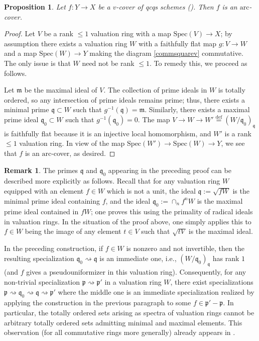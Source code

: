\documentclass[reqno]{amsart}
\newcommand{\arc}{\mathrm{arc}}
\newtheorem{proposition}[theorem]{Proposition}
\theoremstyle{definition}
\newtheorem{remark}[theorem]{Remark}
\begin{document}
\begin{proposition} 
\label{visv1}
Let $f\colon  Y \to X$ be a $v$-cover of qcqs schemes ().   Then $f$ is an $\arc$-cover. 
\end{proposition} 
\begin{proof} 
Let $V$ be a rank $\leq 1$ valuation ring 
with a map $\mathrm{Spec} (V) \to X$; by assumption there exists a 
valuation ring $W$ with 
a faithfully flat map $g\colon  V \to W$ and a map $\mathrm{Spec} (W) \to Y$ making the diagram
\eqref{commsquarev} commutative. 
The only issue is that $W$ need not be rank $\leq 1$.  To remedy this, we  proceed  as follows. 

Let $\mathfrak{m}$ be the maximal ideal of $V$. The collection of prime ideals in $W$ is totally ordered, so any
intersection of prime ideals remains prime; thus, there exists a minimal prime
$\mathfrak{q} \subset W$ such that $g^{-1}(\mathfrak{q}) = \mathfrak{m}$. 
Similarly, there exists a maximal prime ideal $\mathfrak{q}_0 \subset W$ such
that $g^{-1}( \mathfrak{q}_0) = 0$.  The map $V \to W \to W'
\stackrel{\mathrm{def}}{=} 
(W/\mathfrak{q}_0)_{\mathfrak{q}}$ is faithfully flat because it is an injective
local homomorphism, and $W'$ is a 
rank $\leq 1$ valuation ring. 
In view of the map $\mathrm{Spec} (W') \to \mathrm{Spec} (W) \to Y$, we
see that $f$ is an $\arc$-cover, as desired. 
\end{proof} 

\begin{remark}
The primes $\mathfrak{q}$ and $\mathfrak{q}_0$ appearing in the preceding proof
can be described more explicitly as follows. Recall that for any valuation ring
$W$ equipped with an element $f \in W$ which is not a unit, the ideal $\mathfrak{q} := \sqrt{fW}$ is the minimal prime ideal containing $f$, and the ideal $\mathfrak{q}_0 := \cap_n f^n W$ is the maximal prime ideal contained in $fW$; one proves this using the primality of radical ideals in valuation rings. In the situation of the proof above, one simply applies this to $f \in W$ being the image of any element $t \in V$ such that $\sqrt{tV}$ is the maximal ideal.

In the preceding construction, if $f \in W$ is nonzero and not invertible, then the resulting specialization $\mathfrak{q}_0 \rightsquigarrow \mathfrak{q}$ is an immediate one, i.e., $(W/\mathfrak{q}_0)_{\mathfrak{q}}$ has rank $1$ (and $f$ gives a pseudouniformizer in this valuation ring). Consequently, for any non-trivial specialization $\mathfrak{p} \rightsquigarrow \mathfrak{p}'$ in a valuation ring $W$, there exist specializations $\mathfrak{p} \rightsquigarrow \mathfrak{q}_0 \rightsquigarrow \mathfrak{q} \rightsquigarrow \mathfrak{p}'$ where the middle one is an immediate specialization realized by applying the construction in the previous paragraph to some $f \in \mathfrak{p}' - \mathfrak{p}$. In particular, the totally ordered sets arising as spectra of valuation rings cannot be arbitrary totally ordered sets admitting minimal and maximal elements. 
This observation (for all commutative rings more generally) already appears in \cite[Sec. 1-1, Theorem 11] {Kaplansky}. 
\end{remark} 
\end{document}
